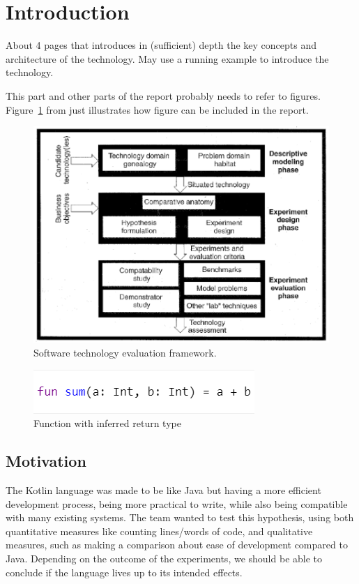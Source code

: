 \section{Introduction}
\label{sec:background}

About 4 pages that introduces in (sufficient) depth the key concepts
and architecture of the technology.  May use a running example to
introduce the technology.

This part and other parts of the report probably needs to refer to
figures. Figure~\ref{fig:framework} from \cite{brown:96} just
illustrates how figure can be included in the report.

\begin{figure}
  \centering
  \includegraphics[scale=0.5]{figs/framework.png}
  \caption{Software technology evaluation framework.}
  \label{fig:framework}
\end{figure}

\begin{figure}
 \centering
 \includegraphics[scale=1]{figs/InferredReturnType.png}
 \caption{Function with inferred return type}
 \label{fig:inferred return type}
\end{figure}



\subsection{Motivation}
The Kotlin language was made to be like Java but having a more efficient development process, being more practical to write, while also being compatible with many existing systems. The team wanted to test this hypothesis, using both quantitative measures like counting lines/words of code, and qualitative measures, such as making a comparison about ease of development compared to Java. Depending on the outcome of the experiments, we should be able to conclude if the language lives up to its intended effects.

